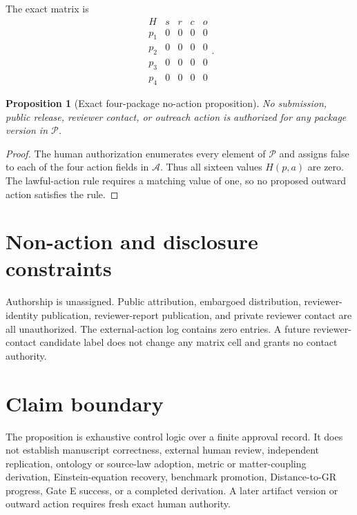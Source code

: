 \documentclass[11pt]{article}
\newtheorem{proposition}{Proposition}
\newcommand{\Packages}{\mathcal{P}}
\newcommand{\Actions}{\mathcal{A}}
\newcommand{\Auth}{H}
\begin{document}
The exact matrix is
\[
\begin{array}{c|cccc}
\Auth & s & r & c & o\\\hline
p_1 & 0&0&0&0\\
p_2 & 0&0&0&0\\
p_3 & 0&0&0&0\\
p_4 & 0&0&0&0
\end{array}.
\]

\begin{proposition}[Exact four-package no-action proposition]
No submission, public release, reviewer contact, or outreach action is
authorized for any package version in $\Packages$.
\end{proposition}

\begin{proof}
The human authorization enumerates every element of $\Packages$ and assigns
false to each of the four action fields in $\Actions$. Thus all sixteen values
$\Auth(p,a)$ are zero. The lawful-action rule requires a matching value of one,
so no proposed outward action satisfies the rule.
\end{proof}

\section{Non-action and disclosure constraints}

Authorship is unassigned. Public attribution, embargoed distribution,
reviewer-identity publication, reviewer-report publication, and private
reviewer contact are all unauthorized. The external-action log contains zero
entries. A future reviewer-contact candidate label does not change any matrix
cell and grants no contact authority.

\section{Claim boundary}

The proposition is exhaustive control logic over a finite approval record. It
does not establish manuscript correctness, external human review, independent
replication, ontology or source-law adoption, metric or matter-coupling
derivation, Einstein-equation recovery, benchmark promotion, Distance-to-GR
progress, Gate E success, or a completed derivation. A later artifact version
or outward action requires fresh exact human authority.
\end{document}
